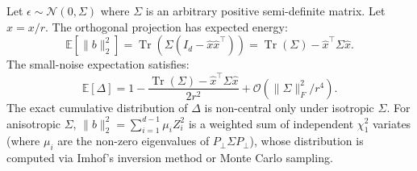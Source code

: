 \begin{corollary}
\label{cor:anisotropic}
Let $\epsilon \sim \mathcal{N}(0, \Sigma)$ where $\Sigma$ is an arbitrary positive semi-definite matrix. Let $\hat{x} = x / r$. The orthogonal projection has expected energy:
\begin{equation}
\mathbb{E}[\|b\|_2^2] = \operatorname{Tr}(\Sigma(I_d - \hat{x}\hat{x}^\top)) = \operatorname{Tr}(\Sigma) - \hat{x}^\top \Sigma \hat{x}.
\end{equation}
The small-noise expectation satisfies:
\begin{equation}
\label{eq:anisotropic_mean}
\mathbb{E}[\Delta] = 1 - \frac{\operatorname{Tr}(\Sigma) - \hat{x}^\top \Sigma \hat{x}}{2r^2} + \mathcal{O}(\|\Sigma\|_F^2 / r^4).
\end{equation}
The exact cumulative distribution of $\Delta$ is non-central only under isotropic $\Sigma$. For anisotropic $\Sigma$, $\|b\|_2^2 = \sum_{i=1}^{d-1} \mu_i Z_i^2$ is a weighted sum of independent $\chi_1^2$ variates (where $\mu_i$ are the non-zero eigenvalues of $P_\perp \Sigma P_\perp$), whose distribution is computed via Imhof's inversion method or Monte Carlo sampling.
\end{corollary}
